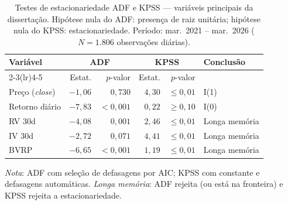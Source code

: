 \begin{table}[H]
\centering
\small
\caption{Testes de estacionariedade ADF e KPSS --- variáveis principais da dissertação. Hipótese nula do ADF: presença de raiz unitária; hipótese nula do KPSS: estacionariedade. Período: mar.\ 2021 -- mar.\ 2026 ($N = 1{.}806$ observações diárias).}
\label{tab:adf_kpss}
\begin{tabular}{lrrrrl}
\toprule
Variável & \multicolumn{2}{c}{ADF} & \multicolumn{2}{c}{KPSS} & Conclusão \\
\cmidrule(lr){2-3}\cmidrule(lr){4-5}
 & Estat. & $p$-valor & Estat. & $p$-valor & \\
\midrule
Preço (\textit{close}) & $-1,06$ & $0,730$ & $4,30$ & ${\leq}0{,}01$ & I(1) \\
Retorno diário & $-7,83$ & $< 0{,}001$ & $0,22$ & ${\geq}0{,}10$ & I(0) \\
RV 30d & $-4,08$ & $0,001$ & $2,46$ & ${\leq}0{,}01$ & Longa memória \\
IV 30d & $-2,72$ & $0,071$ & $4,41$ & ${\leq}0{,}01$ & Longa memória \\
BVRP & $-6,65$ & $< 0{,}001$ & $1,19$ & ${\leq}0{,}01$ & Longa memória \\
\bottomrule
\end{tabular}
\par\smallskip
\footnotesize\textit{Nota}: ADF com seleção de defasagens por AIC; KPSS com constante e defasagens automáticas. \textit{Longa memória}: ADF rejeita (ou está na fronteira) e KPSS rejeita a estacionariedade.
\end{table}
